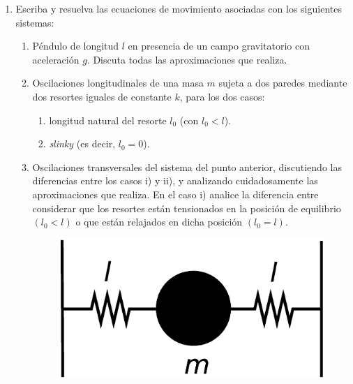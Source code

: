 \documentclass[11pt,spanish]{article}
\begin{document}
\begin{enumerate}


    \item Escriba y resuelva las ecuaciones de movimiento asociadas con los
    siguientes sistemas: 

    \begin{enumerate}
        \item Péndulo de longitud $l$ en presencia de un campo gravitatorio con
        aceleración $g$. Discuta todas las aproximaciones que realiza.
        \item Oscilaciones longitudinales de una masa $m$ sujeta a dos paredes
        mediante dos resortes iguales de constante $k$, para los dos casos: 
    
        \begin{enumerate}
            \item longitud natural del resorte $l_{0}$ (con $ l_{0}<l$).
            \item \textit{slinky} (es decir, $l_{0}=0$). 
        \end{enumerate}
        
        \item Oscilaciones transversales del sistema del punto anterior,
        discutiendo las diferencias entre los casos i) y ii), y analizando 
        cuidadosamente las aproximaciones que realiza. En el caso i) analice
        la diferencia entre considerar que los resortes están tensionados en
        la posición de equilibrio $(l_{0}<l)$ o que están relajados en dicha
        posición $(l_{0}=l)$.
    
        \begin{figure}[H]
            \centering{}\includegraphics[clip,scale=0.25]{figs/ej1-1}
        \end{figure}
    

\end{enumerate}
\end{enumerate}
\end{document}
